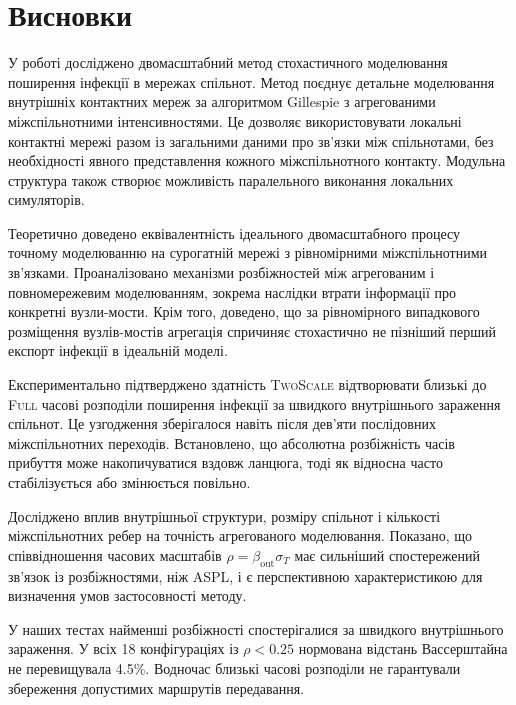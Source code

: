 \documentclass[a4paper,fleqn]{cas-sc}
\newcommand{\Full}{\textup{\textsc{Full}}}
\newcommand{\TS}{\textup{\textsc{TwoScale}}}
\begin{document}
\section{Висновки}
\label{sec:conclusions}

У роботі досліджено
двомасштабний метод
стохастичного моделювання
поширення інфекції
в мережах спільнот.
Метод поєднує детальне
моделювання внутрішніх
контактних мереж
за алгоритмом Gillespie
з агрегованими
міжспільнотними
інтенсивностями.
Це дозволяє використовувати
локальні контактні мережі
разом із загальними
даними про зв'язки
між спільнотами,
без необхідності
явного представлення
кожного міжспільнотного
контакту. Модульна
структура також
створює можливість
паралельного виконання
локальних симуляторів.

Теоретично доведено
еквівалентність ідеального
двомасштабного процесу
точному моделюванню
на сурогатній мережі
з рівномірними
міжспільнотними
зв'язками. Проаналізовано
механізми розбіжностей
між агрегованим
і повномережевим
моделюванням,
зокрема наслідки
втрати інформації
про конкретні
вузли-мости. Крім того, доведено, що за
рівномірного випадкового розміщення
вузлів-мостів агрегація спричиняє
стохастично не пізніший перший
експорт інфекції в ідеальній моделі.

Експериментально
підтверджено здатність
\TS{} відтворювати
близькі до \Full{}
часові розподіли
поширення інфекції
за швидкого внутрішнього
зараження спільнот.
Це узгодження
зберігалося навіть
після дев'яти
послідовних
міжспільнотних
переходів.
Встановлено, що
абсолютна розбіжність
часів прибуття
може накопичуватися
вздовж ланцюга,
тоді як відносна
часто стабілізується
або змінюється
повільно.

Досліджено вплив
внутрішньої структури,
розміру спільнот
і кількості
міжспільнотних
ребер на точність
агрегованого
моделювання.
Показано, що
співвідношення
часових масштабів
$\rho=\beta_{\mathrm{out}}\sigma_T$
має сильніший
спостережений зв'язок
із розбіжностями,
ніж ASPL, і є
перспективною
характеристикою
для визначення
умов застосовності
методу.

У наших тестах найменші розбіжності спостерігалися
за швидкого внутрішнього зараження. У всіх 18
конфігураціях із $\rho<0.25$ нормована відстань
Вассерштайна не перевищувала 4.5\%.
Водночас близькі часові розподіли не гарантували
збереження допустимих маршрутів передавання.






\clearpage



\end{document}
